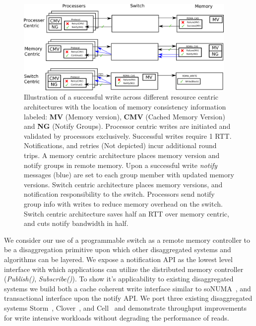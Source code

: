\begin{figure}
      \centering
      \includegraphics[width=0.95\textwidth]{fig/notify.png}
      \caption{Illustration of a successful write across different
      resource centric architectures with the location of memory
      consistency information labeled: \textbf{MV} (Memory version),
      \textbf{CMV} (Cached Memory Version) and \textbf{NG} (Notify
      Groups). Processor centric writes are
      initiated and validated by processors exclusively. Successful
      writes require 1 RTT. Notifications, and retries (Not depicted)
    incur additional round trips. A memory centric architecture places
    memory version and notify groups in remote memory. Upon a
    successful write \textit{notify} messages (blue) are set to each
    group member with updated memory versions. Switch centric
    architecture places memory versions, and notification
    responsibility to the switch. Processors send notify group info
    with writes to reduce memory overhead on the switch. Switch
    centric architecture saves half an RTT over memory centric, and
    cuts notify bandwidth in half.
      \label{fig:notify}
    }
\end{figure}


We consider our use of a programmable switch as a remote memory
controller to be a disaggregation primitive upon which other
disaggregated systems and algorithms can be layered. We expose a
notification API as the lowest level interface with which applications
can utilize the distributed memory controller (\textit{Publish()},
\textit{Subscribe()}). To show it's applicability to existing
disaggregated systems we build both a cache coherent write interface
similar to soNUMA~\cite{sonuma}, and transactional interface upon the
notify API. We port three existing disaggregated systems
Storm~\cite{storm}, Clover~\cite{clover}, and Cell~\cite{cell} and
demonstrate throughput improvements for write intensive workloads
without degrading the performance of reads.

